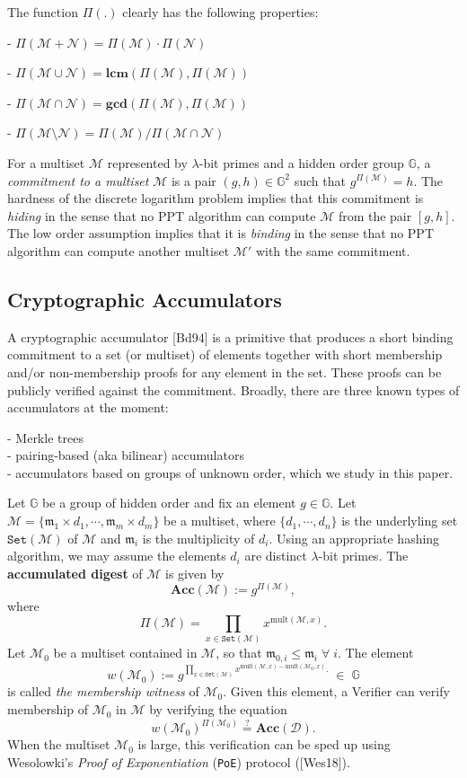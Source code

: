 \documentclass[11pt, lettersize, notitlepage, leqno, footskip=0.6cm]{article}
\newcommand{\pl}{\prod\limits}
\newcommand{\ttt}{\texttt}
\newcommand{\bG}{\mathbb{G}}
\newcommand{\Acc}{\mbf{Acc}}
\newcommand{\sett}{\ttt{Set}}
\newcommand{\mult}{\mr{mult}}
\newcommand{\mc}{\mathcal}
\newcommand{\mb}{\mathbb}
\newcommand{\mbf}{\mathbf}
\newcommand{\mr}{\mathrm}
\newcommand{\mfm}{\mathfrak{m}}
\newcommand{\sm}{\setminus}
\newcommand{\lam}{\lambda}
\newcommand{\mcM}{\mc{M}}
\newcommand{\vs}{\vspace{-0.15cm}}
\newcommand{\noin}{\noindent}
\newcommand{\sta}{\stackrel{?}{=}}
\newcommand{\LCM}{\mbf{lcm}}
\newcommand{\GCD}{\mbf{gcd}}
\numberwithin{equation}{section}
\begin{document}
\noin The function $\Pi(.)$ clearly has the following properties:

\noin- $\Pi(\mc{M}+\mc{N})= \Pi(\mc{M})\cdot\Pi(\mc{N})$

\noin - $\Pi(\mc{M}\cup \mc{N}) = \LCM(\Pi(\mc{M}), \Pi(\mc{M}))$

\noin - $\Pi(\mc{M}\cap \mc{N}) = \GCD(\Pi(\mc{M}), \Pi(\mc{M}))$

\noin - $\Pi(\mc{M}\sm \mc{N}) = {\Pi(\mc{M})}/{\Pi(\mc{M}\cap \mc{N})}$\vspace{0.1cm}

For a multiset $\mc{M}$ represented by $\lam$-bit primes and a hidden order group $\bG$, a \textit{commitment to a multiset} $\mc{M}$ is a pair $(g, h)\in\bG^2$ such that $g^{\Pi(\mc{M})} = h$. The hardness of the discrete logarithm problem implies that this commitment is \textit{hiding} in the sense that no PPT algorithm can compute $\mcM$ from the pair $[g,h]$. The low order assumption implies that it is \textit{binding} in the sense that no PPT algorithm can compute another multiset $\mcM'$ with the same commitment.

\subsection{\fontsize{11}{11}\selectfont Cryptographic Accumulators }

A cryptographic accumulator [Bd94] is a primitive that produces a short binding commitment to a set (or multiset) of elements together with short membership and/or non-membership proofs for any element in the set. These proofs can be publicly verified against the commitment. Broadly, there are three known types of accumulators at the moment: 

\noin - Merkle trees\\
- pairing-based (aka bilinear) accumulators \\  
- accumulators based on groups of unknown order, which we study in this paper. 

Let $\mb{G}$ be a group of hidden order and fix an element $g \in\mb{G}$. Let $\mc{M}= \{\mfm_1\times d_1,\cdots, \mfm_m\times d_m\}$ be a multiset, where $\{d_1,\cdots, d_n \}$ is the underlyling set $\sett(\mc{M})$ of $\mc{M}$ and $\mfm_i$ is the multiplicity of $d_i$. Using an appropriate hashing algorithm, we may assume the elements $d_i$ are distinct $\lam$-bit primes. The \textbf{accumulated digest} of $\mc{M}$ is given by \vs $$\Acc(\mc{M}):= g^{\Pi(\mc{M})} ,$$ where $$\Pi(\mc{M}) = \pl_{x\in \sett(\mc{M})} x^{\mult(\mc{M},x)} .$$ Let $\mc{M}_0$ be a multiset contained in $\mc{M}$, so that  $\mfm_{0,i}\leq \mfm_i\;\forall\;i$. The element \vs $$w(\mc{M}_0):= g^{\pl_{x\in \sett(\mc{M})} x^{\mult(\mc{M},x)-\mult(\mc{M}_0,x)} .}\;\in\;\mb{G} $$ is called \textit{the membership witness} of $\mc{M}_0$. Given this element, a Verifier can verify membership of $\mc{M}_0$ in $\mc{M}$ by verifying the equation \vs $$w(\mc{M}_0)^{\Pi(\mc{M}_0)} \sta \Acc(\mc{D}).$$ When the multiset $\mc{M}_0$ is large, this verification can be sped up using Wesolowki's \textit{Proof of Exponentiation} (\verb|PoE|) protocol ([Wes18]).
\end{document}
